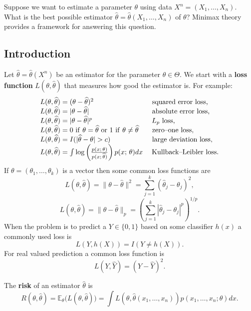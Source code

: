\documentclass[twoside,12pt]{article}
\newcommand\E{\mathbb{E}}
\begin{document}
Suppose we want to estimate a parameter $\theta$ using data
$X^n = (X_1, \ldots, X_n)$. What is the best possible estimator
$\widehat\theta = \widehat\theta(X_1, \ldots, X_n)$ of $\theta$?
Minimax theory provides a framework for answering this question.


\subsection{Introduction}

Let $\widehat\theta = \widehat\theta(X^n)$ be an estimator
for the parameter $\theta\in\Theta$.
We start with a {\bf loss function}
$L(\theta,\widehat\theta)$ that measures how good the estimator is.
For example:
$$
\begin{array}{ll}
L(\theta,\widehat\theta) = (\theta -\widehat\theta)^2 & \mbox{ squared error loss,}\\
L(\theta,\widehat\theta) = |\theta -\widehat\theta|   & \mbox{ absolute error loss,}\\
L(\theta,\widehat\theta) = |\theta -\widehat\theta|^p & 
\hspace{.1cm}\mbox{$L_p$\ loss,}\\
L(\theta,\widehat\theta) = 0\ {\rm if\ }\theta=\widehat\theta \ {\rm or}\ 1\ 
{\rm if\ }\theta\neq \widehat\theta &\mbox{ zero--one loss,}\\
L(\theta,\widehat\theta) = I(|\widehat\theta-\theta| > c) &\mbox{ large deviation loss,}\\
L(\theta,\widehat\theta) = 
\int \log \left( \frac{p(x;\, \theta)}{p(x;\, \widehat\theta)}\right)
                 p(x;\, \theta) dx & 
\hspace{.1cm}\mbox{Kullback--Leibler loss}.
\end{array}
$$
If $\theta=(\theta_1,\ldots,\theta_k)$ is a vector then some common loss functions are
$$
L(\theta,\widehat\theta) = \|\theta-\widehat\theta\|^2 = \sum_{j=1}^k(\widehat\theta_j-\theta_j)^2,
$$
$$
L(\theta,\widehat\theta) = \|\theta-\widehat\theta\|_p = \left(\sum_{j=1}^k |\widehat\theta_j-\theta_j|^p\right)^{1/p}.
$$
When the problem is to predict a $Y\in\{0,1\}$
based on some classifier $h(x)$ a commonly used loss is
$$
L(Y,h(X)) = I(Y \neq h(X)).
$$
For real valued prediction a common loss function is
$$
L(Y,\widehat Y) = (Y - \widehat{Y})^2.
$$

\vspace{1cm}


The {\bf risk} of an estimator $\widehat\theta$ is
\begin{equation}
R(\theta, \widehat\theta) = 
\E_\theta \biggl(L(\theta, \widehat\theta)\biggr)=
\int L(\theta, \widehat\theta(x_1,\ldots, x_n)) p(x_1,\ldots, x_n ; \theta) dx.
\end{equation}
\end{document}
